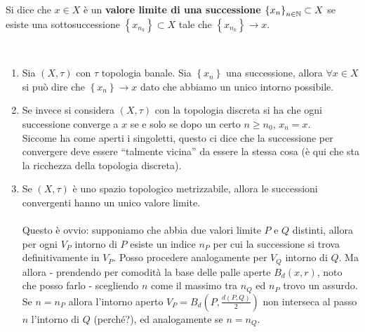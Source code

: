 \begin{definition}
	Si dice che $x \in X$ è un \textbf{valore limite di una successione $\left\{x_n\right\}_{n\in \mathbb{N}} \subset X$} se esiste una sottosuccessione $\left\{x_{n_k}\right\} \subset X$ tale che $\left\{x_{n_k}\right\} \rightarrow x$.
\end{definition}

\begin{example}\
\begin{enumerate}
	\item Sia $(X,\tau)$ con $\tau$ topologia banale. Sia $\left\{x_n\right\}$ una 
		successione, allora $\forall x \in X$ si può dire che $\left\{x_n\right\} 
		\rightarrow x$ dato che abbiamo un unico intorno possibile. 
	\item Se invece si considera $(X,\tau)$ con la topologia discreta si 
		ha che ogni successione converge a $x$ se e solo se dopo un certo 
		$n \ge n_0$, $x_n = x$. \\ Siccome ha come aperti i singoletti, questo ci 
		dice che la successione per convergere deve essere \enquote{talmente vicina} da 
		essere la stessa cosa (è qui che sta la ricchezza della topologia 
		discreta).
	\item Se $(X,\tau)$ è uno spazio topologico metrizzabile, allora le 
		successioni convergenti hanno un unico valore limite. \\  \\
		Questo è ovvio: supponiamo che abbia due valori limite $P$ e $Q$ distinti, allora per ogni $V_P$ intorno di $P$ esiste un indice $n_P$ per cui la successione si trova definitivamente in $V_P$. Posso procedere analogamente per $V_Q$ intorno di $Q$. Ma allora - prendendo per comodità la base delle palle aperte $B_d(x,r)$, noto che posso farlo - scegliendo $n$ come il massimo tra $n_Q$ ed $n_P$ trovo un assurdo. Se $n=n_P$ allora l'intorno aperto $V_P = B_d(P,\frac{d(P,Q)}{2})$ non interseca al passo $n$ l'intorno di $Q$ (perché?), ed analogamente se $n=n_Q$.
\end{enumerate}
\end{example}

